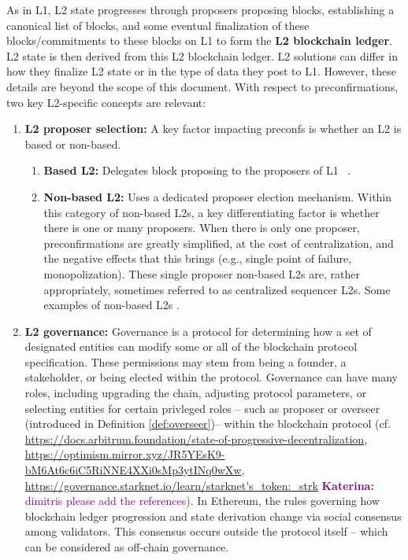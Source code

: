 \documentclass[a4paper]{article}
\theoremstyle{boldstyle}
\newcommand{\ks}[1]{\textcolor{purple}{\textbf{Katerina:} #1}}
\begin{document}
As in L1, L2 state progresses through proposers proposing blocks, establishing a canonical list of blocks, and some eventual finalization of these blocks/commitments to these blocks on L1 to form the \textbf{L2 blockchain ledger}. L2 state is then derived from this L2 blockchain ledger. L2 solutions can differ in how they finalize L2 state or in the type of data they post to L1. However, these details are beyond the scope of this document. With respect to preconfirmations, two key L2-specific concepts are relevant:
\begin{enumerate}
    \item \textbf{L2 proposer selection:} A key factor impacting preconfs is whether an L2 is based or non-based.
    \begin{enumerate}
        \item \textbf{Based L2:} Delegates block proposing to the proposers of L1 ~\cite{W:ExaminingtheBasedSequencingSpectrum,W:BasedrollupssuperpowersfromL1sequencing}. 
        \item \textbf{Non-based L2:} Uses a dedicated proposer election mechanism. Within this category of non-based L2s, a key differentiating factor is whether there is one or many proposers. When there is only one proposer, preconfirmations are greatly simplified, at the cost of centralization, and the negative effects that this brings (e.g., single point of failure, monopolization). These single proposer non-based L2s are, rather appropriately, sometimes referred to as centralized sequencer L2s.  Some examples of non-based L2s \cite{Optimism, Arbitrum, ZKsync, Starknet}. %
    \end{enumerate}
    \item \textbf{L2 governance:}
    Governance is a protocol for determining how a set of designated entities can modify some or all of the blockchain protocol specification. These permissions may stem from being a founder, a stakeholder, or being elected within the protocol.  Governance can have many roles, including upgrading the chain, adjusting protocol parameters, or selecting entities for certain privleged roles -- such as proposer or overseer (introduced in Definition \ref{def:overseer})-- within the blockchain protocol (cf. \url{https://docs.arbitrum.foundation/state-of-progressive-decentralization}, \url{https://optimism.mirror.xyz/JR5YEsK9-bM6At6c6iC5RiNNE4XXi0sMp3ytINq0wXw}, \url{https://governance.starknet.io/learn/starknet's_token:_strk} \ks{dimitris please add the references}).     
    In Ethereum, the rules governing how blockchain ledger progression and state derivation change via social consensus among validators. This consensus occurs outside the protocol itself -- which can be considered as off-chain governance. 
    

\end{enumerate}
\end{document}
